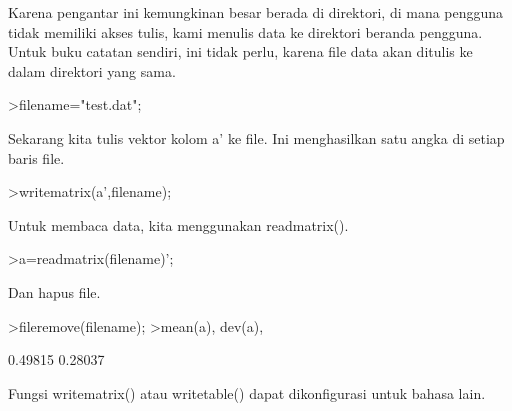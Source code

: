 \documentclass[a4paper,10pt]{article}
\begin{document}
\begin{eulernotebook}
\begin{eulercomment}
\begin{eulercomment}
\begin{eulercomment}
\begin{eulercomment}
\begin{eulercomment}
\begin{eulercomment}
\begin{eulercomment}
Karena pengantar ini kemungkinan besar berada di direktori, di mana
pengguna tidak memiliki akses tulis, kami menulis data ke direktori
beranda pengguna. Untuk buku catatan sendiri, ini tidak perlu, karena
file data akan ditulis ke dalam direktori yang sama.
\end{eulercomment}
\begin{eulerprompt}
>filename="test.dat";
\end{eulerprompt}
\begin{eulercomment}
Sekarang kita tulis vektor kolom a' ke file. Ini menghasilkan satu
angka di setiap baris file.
\end{eulercomment}
\begin{eulerprompt}
>writematrix(a',filename);
\end{eulerprompt}
\begin{eulercomment}
Untuk membaca data, kita menggunakan readmatrix().
\end{eulercomment}
\begin{eulerprompt}
>a=readmatrix(filename)';
\end{eulerprompt}
\begin{eulercomment}
Dan hapus file.
\end{eulercomment}
\begin{eulerprompt}
>fileremove(filename);
>mean(a), dev(a),
\end{eulerprompt}
\begin{euleroutput}
  0.49815
  0.28037
\end{euleroutput}
\begin{eulercomment}
Fungsi writematrix() atau writetable() dapat dikonfigurasi untuk
bahasa lain.


\end{eulercomment}
\end{eulercomment}
\end{eulercomment}
\end{eulercomment}
\end{eulercomment}
\end{eulercomment}
\end{eulercomment}
\end{eulernotebook}
\end{document}
